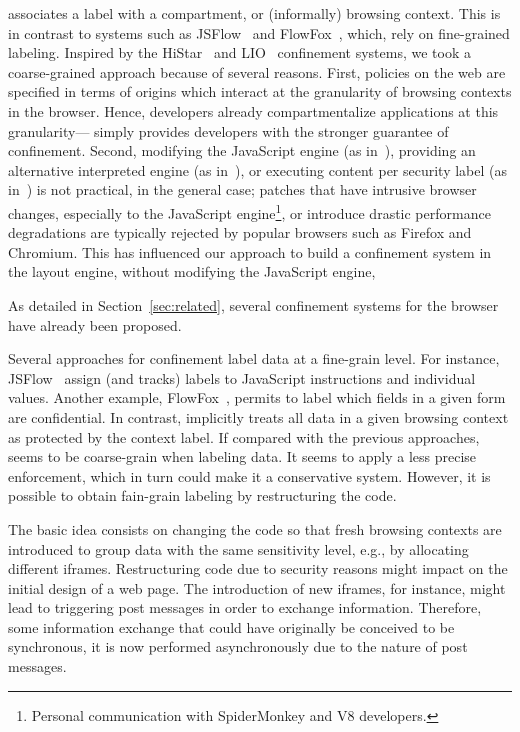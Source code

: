 \sys{} associates a label with a compartment, or (informally) browsing
context.
%
This is in contrast to systems such as JSFlow~\cite{Hedin:2012} and
FlowFox~\cite{DeGroef:2012}, which, rely on fine-grained labeling.
%
Inspired by the HiStar~ and
LIO~ confinement systems, we took a coarse-grained
approach because of several reasons.
%
First, policies on the web are specified in terms of origins which
interact at the granularity of browsing contexts in the browser.
%
Hence, developers already compartmentalize applications at this
granularity---\sys{} simply provides developers with the stronger
guarantee of confinement.
%
Second, modifying the JavaScript engine (as in~\tocite{}), providing
an alternative interpreted engine (as in~\cite{Hedin:2012}), or executing
content per security label (as in~) is not
practical, in the general case;
patches that have intrusive browser changes, especially to the
JavaScript engine\footnote{
  Personal communication with SpiderMonkey and V8 developers.
}, or introduce
drastic performance degradations are typically rejected by popular
browsers such as Firefox and Chromium.
%
This has influenced our approach to build a confinement system in the
layout engine, without modifying the JavaScript engine, 



As detailed in Section~\ref{sec:related}, several confinement systems
for the browser have already been proposed.

Several approaches for confinement label data at a fine-grain level. For
instance, JSFlow~\cite{Hedin:2012}\tocite{} assign (and tracks) labels to
JavaScript instructions and individual values. Another example,
FlowFox~\cite{DeGroef:2012}, permits to label which fields in a given form are
confidential. In contrast, \sys{} implicitly treats all data in a given browsing
context as protected by the context label.  If compared with the previous
approaches, \sys{} seems to be coarse-grain when labeling data.  It seems to
apply a less precise enforcement, which in turn could make it a conservative
system. However, it is possible to obtain fain-grain labeling by restructuring
the code.

The basic idea consists on changing the code so that fresh browsing contexts are
introduced to group data with the same sensitivity level, e.g., by allocating
different iframes.  Restructuring code due to security reasons might impact on
the initial design of a web page. The introduction of new iframes, for instance,
might lead to triggering post messages in order to exchange
information. Therefore, some information exchange that could have 
originally be conceived to be synchronous, it is now performed asynchronously due to the
nature of post messages. 





